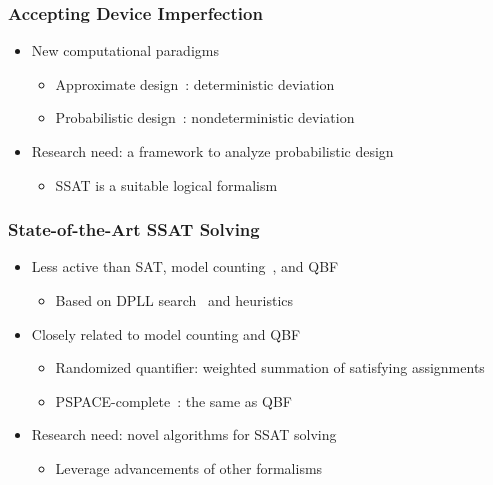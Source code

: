 \begin{frame}
      \frametitle{Accepting Device Imperfection}
      \begin{itemize}
            \item New computational paradigms
                  \pause
                  \begin{itemize}
                        \item Approximate design~\cite{Venkatesan2011ApproxDesign}: deterministic deviation
                              \pause
                        \item Probabilistic design~\cite{Chakrapani2006ProbDesign}: nondeterministic deviation
                              \pause
                  \end{itemize}
            \item \alert{Research need: a framework to analyze probabilistic design}
                  \pause
                  \begin{itemize}
                        \item SSAT is a suitable logical formalism
                  \end{itemize}
      \end{itemize}
\end{frame}

\begin{frame}
      \frametitle{State-of-the-Art SSAT Solving}
      \begin{itemize}
            \item Less active than SAT, model counting~\cite{SATHandbook-ModelCounting}, and QBF
                  \pause
                  \begin{itemize}
                        \item Based on DPLL search~\cite{Davis1962} and heuristics
                              \pause
                  \end{itemize}
            \item Closely related to model counting and QBF
                  \pause
                  \begin{itemize}
                        \item Randomized quantifier: weighted summation of satisfying assignments
                              \pause
                        \item PSPACE-complete~\cite{Stockmeyer1973}: the same as QBF
                              \pause
                  \end{itemize}
            \item \alert{Research need: novel algorithms for SSAT solving}
                  \pause
                  \begin{itemize}
                        \item Leverage advancements of other formalisms
                  \end{itemize}
      \end{itemize}
\end{frame}

